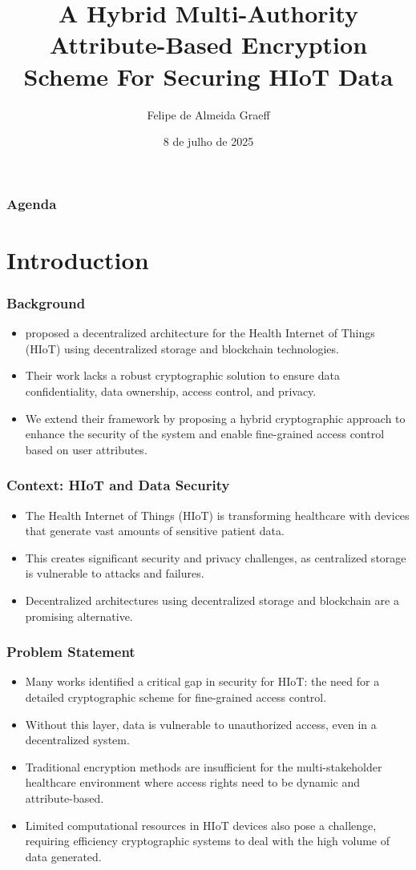 \documentclass{beamer}
\title[HIoT Data Security with MA-ABE]{A Hybrid Multi-Authority Attribute-Based Encryption Scheme For Securing HIoT Data}
\author{Felipe de Almeida Graeff}
\institute{Instituto de Informática --- UFRGS \\ \vspace{0.5cm} Advisor: Prof. Dr. Jéferson Campos Nobre \\ Co-advisor: M.Sc Laura Rodrigues Soares}
\date{8 de julho de 2025}
\begin{document}
\begin{frame}[plain]
\titlepage
\end{frame}

\begin{frame}
\frametitle{Agenda}
\tableofcontents
\end{frame}

\section{Introduction}

\begin{frame}
\frametitle{Background}
\begin{itemize}
\item {} proposed a decentralized architecture for the Health Internet of Things (HIoT) using decentralized storage and blockchain technologies.
\item Their work lacks a robust cryptographic solution to ensure data confidentiality, data ownership, access control, and privacy.
\item We extend their framework by proposing a hybrid cryptographic approach to enhance the security of the system and enable fine-grained access control based on user attributes.
\end{itemize}
\end{frame}

\begin{frame}
\frametitle{Context: HIoT and Data Security}
\begin{itemize}
\item The Health Internet of Things (HIoT) is transforming healthcare with devices that generate vast amounts of sensitive patient data.
\item This creates significant security and privacy challenges, as centralized storage is vulnerable to attacks and failures.
\item Decentralized architectures using decentralized storage and blockchain are a promising alternative.
\end{itemize}
\end{frame}

\begin{frame}
\frametitle{Problem Statement}
\begin{itemize}
\item Many works identified a critical gap in security for HIoT: the need for a detailed cryptographic scheme for fine-grained access control.
\item Without this layer, data is vulnerable to unauthorized access, even in a decentralized system.
\item Traditional encryption methods are insufficient for the multi-stakeholder healthcare environment where access rights need to be dynamic and attribute-based.
\item Limited computational resources in HIoT devices also pose a challenge, requiring efficiency cryptographic systems to deal with the high volume of data generated.
\end{itemize}
\end{frame}
\end{document}
